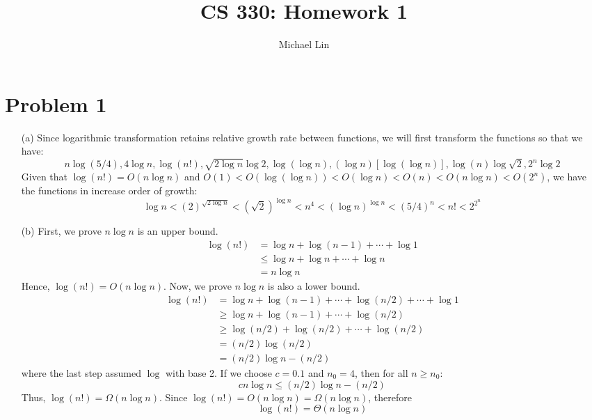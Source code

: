 \documentclass{article}
\title{CS 330: Homework 1}
\author{Michael Lin}
\begin{document}
\maketitle
\section*{Problem 1}

	\begin{enumerate}
	\item[(a)] Since logarithmic transformation retains relative growth rate between functions, we will first transform the functions so that we have:
	$$n \log(5/4), 4\log n, \log(n!), \sqrt{2\log n}\log 2, \log(\log n), (\log n)[\log(\log n)], \log(n)\log\sqrt{2}, 2^n\log 2$$
	Given that $\log (n!) = O(n\log n)$ and $O(1) < O(\log (\log n)) < O(\log n) < O(n) < O(n\log n) < O(2^n)$, we have the functions in increase order of growth:
	$$\log n < (2)^{\sqrt{2\log n}} < (\sqrt{2})^{\log n} < n^4 < (\log n)^{\log n} < (5/4)^n < n! < 2^{2^n}$$
	\item[(b)] First, we prove $n\log n$ is an upper bound.
	\begin{align*}
	\log(n!) &= \log n + \log (n-1) + \cdots + \log 1\\
	&\leq \log n + \log n + \cdots + \log n \\
	&= n\log n
	\end{align*}
	Hence, $\log(n!) = O(n\log n)$.
	Now, we prove $n \log n$ is also a lower bound.
	\begin{align*}
	\log(n!) &= \log n + \log (n-1) + \cdots + \log (n/2) + \cdots + \log 1\\
	&\geq \log n + \log (n-1) + \cdots + \log (n/2) \\
	&\geq \log (n/2) + \log (n/2) + \cdots + \log (n/2) \\
	&= (n/2)\log (n/2) \\
	&= (n/2)\log n - (n/2)
	\end{align*}
	where the last step assumed $\log$ with base 2. If we choose $c=0.1$ and $n_0=4$, then for all $n\geq n_0$: $$c n\log n \leq (n/2)\log n - (n/2)$$
	Thus, $\log(n!)=\Omega(n \log n)$. Since $\log(n!) = O(n\log n)=\Omega(n \log n)$, therefore $$\log(n!) = \Theta(n\log n)$$
	\end{enumerate}

\pagebreak
\end{document}
